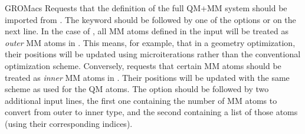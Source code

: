 \begin{keywordlist}

\item[GROMacs]
Requests that the definition of the full QM+MM system should be imported from . The keyword should be followed by one of the options  or  on the next line. In the case of , all MM atoms defined in the  input will be treated as \emph{outer} MM atoms in \molcas. This means, for example, that in a geometry optimization, their positions will be updated using microiterations rather than the conventional optimization scheme. Conversely,  requests that certain MM atoms should be treated as \emph{inner} MM atoms in \molcas. Their positions will be updated with the same scheme as used for the QM atoms. The  option should be followed by two additional input lines, the first one containing the number of MM atoms to convert from outer to inner type, and the second containing a list of those atoms (using their corresponding  indices).


\end{keywordlist}
